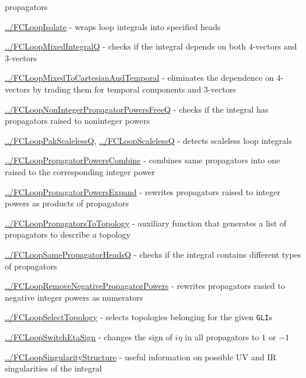 \documentclass[../FeynCalcManual.tex]{subfiles}
\begin{document}
\begin{itemize}
{  propagators
\item
  \hyperlink{../fcloopisolate}{../FCLoopIsolate} - wraps loop integrals
  into specified heads
\item
  \hyperlink{../fcloopmixedintegralq}{../FCLoopMixedIntegralQ} - checks
  if the integral depends on both \(4\)-vectors and \(3\)-vectors
\item
  \hyperlink{../fcloopmixedtocartesianandtemporal}{../FCLoopMixedToCartesianAndTemporal}
  - eliminates the dependence on \(4\)-vectors by trading them for
  temporal components and \(3\)-vectors
\item
  \hyperlink{../fcloopnonintegerpropagatorpowersfreeq}{../FCLoopNonIntegerPropagatorPowersFreeQ}
  - checks if the integral has propagators raised to noninteger powers
\item
  \hyperlink{../fclooppakscalelessq}{../FCLoopPakScalelessQ},
  \hyperlink{../fcloopscalelessq}{../FCLoopScalelessQ} - detects
  scaleless loop integrals
\item
  \hyperlink{../fclooppropagatorpowerscombine}{../FCLoopPropagatorPowersCombine}
  - combines same propagators into one raised to the corresponding
  integer power
\item
  \hyperlink{../fclooppropagatorpowersexpand}{../FCLoopPropagatorPowersExpand}
  - rewrites propagators raised to integer powers as products of
  propagators
\item
  \hyperlink{../fclooppropagatorstotopology}{../FCLoopPropagatorsToTopology}
  - auxiliary function that generates a list of propagators to describe
  a topology
\item
  \hyperlink{../fcloopsamepropagatorheadsq}{../FCLoopSamePropagatorHeadsQ}
  - checks if the integral contains different types of propagators
\item
  \hyperlink{../fcloopremovenegativepropagatorpowers}{../FCLoopRemoveNegativePropagatorPowers}
  - rewrites propagators rasied to negative integer powers as numerators
\item
  \hyperlink{../fcloopselecttopology}{../FCLoopSelectTopology} - selects
  topologies belonging for the given \texttt{GLI}s
\item
  \hyperlink{../fcloopswitchetasign}{../FCLoopSwitchEtaSign} - changes
  the sign of \(i \eta\) in all propagators to \(1\) or \(-1\)
\item
  \hyperlink{../fcloopsingularitystructure}{../FCLoopSingularityStructure}
  - useful information on possible UV and IR singularities of the
  integral
\item
}
\end{itemize}
\end{document}

